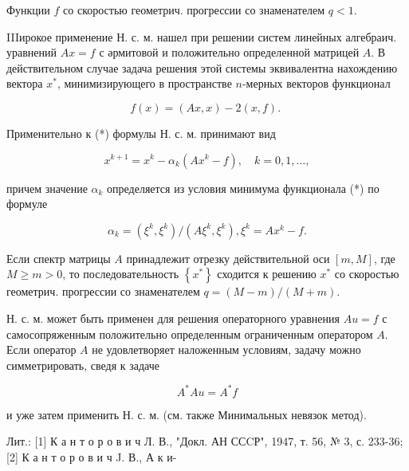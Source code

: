\documentclass[10pt]{article}
\begin{document}
Функции $f$ со скоростью геометрич. прогрессии со знаменателем $q<1$.



IIIирокое применение Н. с. м. нашел при решении систем линейных алгебраич. уравнений $A x=f$ с әрмитовой и положительно определенной матрицей $A$. В действительном случае задача решения этой системы эквивалентна нахождению вектора $x^{*}$, минимизирующего в пространстве $n$-мерных векторов функционал



\[

f(x)=(A x, x)-2(x, f) \text {. }

\]



Применительно к (*) формулы Н. с. м. принимают вид



\[

x^{k+1}=x^{k}-\alpha_{k}\left(A x^{k}-f\right), \quad k=0,1, \ldots,

\]



причем значение $\alpha_{k}$ определяется из условия минимума функционала (*) по формуле



\[

\alpha_{k}=\left(\xi^{k}, \xi^{k}\right) /\left(A \xi^{k}, \xi^{k}\right), \xi^{k}=A x^{k}-f .

\]



Если спектр матрицы $A$ принадлежит отрезку действительной оси $[m, M]$, где $M \geqslant m>0$, то последовательность $\left\{x^{*}\right\}$ сходится к решению $x^{*}$ со скоростью геометрич. прогрессии со знаменателем $q=(M-m) /(M+m)$.



Н. с. м. может быть применен для решения операторного уравнения $A u=f$ с самосопряженным положительно определенным ограниченным оператором $A$. Если оператор $A$ не удовлетворяет наложенным условиям, задачу можно симметрировать, сведя к задаче



\[

A^{*} A u=A^{*} f

\]



и уже затем применить Н. с. м. (см. также Минимальных невязок метод).



Лит.: [1] К а н т о р о в и ч Л. В., "Докл. АН ССCР", 1947, т. 56, № 3, с. 233-36; [2] К а н т о р о в и ч J. В., А к и-
\end{document}
